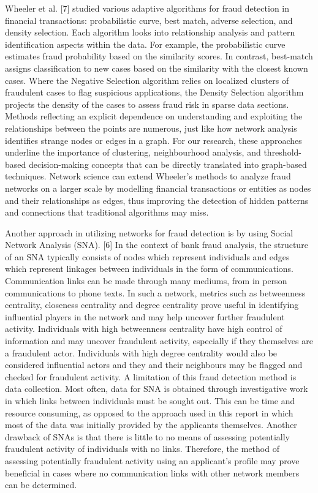 \documentclass{styles/svproc}
\begin{document}
\bigskip
\noindent Wheeler et al. [7] studied various adaptive algorithms for fraud detection in financial transactions: probabilistic curve, best match, adverse selection, and density selection. Each algorithm looks into relationship analysis and pattern identification aspects within the data. For example, the probabilistic curve estimates fraud probability based on the similarity scores. In contrast, best-match assigns classification to new cases based on the similarity with the closest known cases. Where the Negative Selection algorithm relies on localized clusters of fraudulent cases to flag suspicious applications, the Density Selection algorithm projects the density of the cases to assess fraud risk in sparse data sections. Methods reflecting an explicit dependence on understanding and exploiting the relationships between the points are numerous, just like how network analysis identifies strange nodes or edges in a graph. For our research, these approaches underline the importance of clustering, neighbourhood analysis, and threshold-based decision-making concepts that can be directly translated into graph-based techniques. Network science can extend Wheeler's methods to analyze fraud networks on a larger scale by modelling financial transactions or entities as nodes and their relationships as edges, thus improving the detection of hidden patterns and connections that traditional algorithms may miss.

\bigskip
\noindent Another approach in utilizing networks for fraud detection is by using Social Network Analysis (SNA). [6] In the context of bank fraud analysis, the structure of an SNA typically consists of nodes which represent individuals and edges which represent linkages between individuals in the form of communications. Communication links can be made through many mediums, from in person communications to phone texts. In such a network, metrics such as betweenness centrality, closeness centrality and degree centrality prove useful in identifying influential players in the network and may help uncover further fraudulent activity. Individuals with high betweenness centrality have high control of information and may uncover fraudulent activity, especially if they themselves are a fraudulent actor. Individuals with high degree centrality would also be considered influential actors and they and their neighbours may be flagged and checked for fraudulent activity.
A limitation of this fraud detection method is data collection. Most often, data for SNA is obtained through investigative work in which links between individuals must be sought out. This can be time and resource consuming, as opposed to the approach used in this report in which most of the data was initially provided by the applicants themselves. Another drawback of SNAs is that there is little to no means of assessing potentially fraudulent activity of individuals with no links. Therefore, the method of assessing potentially fraudulent activity using an applicant’s profile may prove beneficial in cases where no communication links with other network members can be determined.
\end{document}
